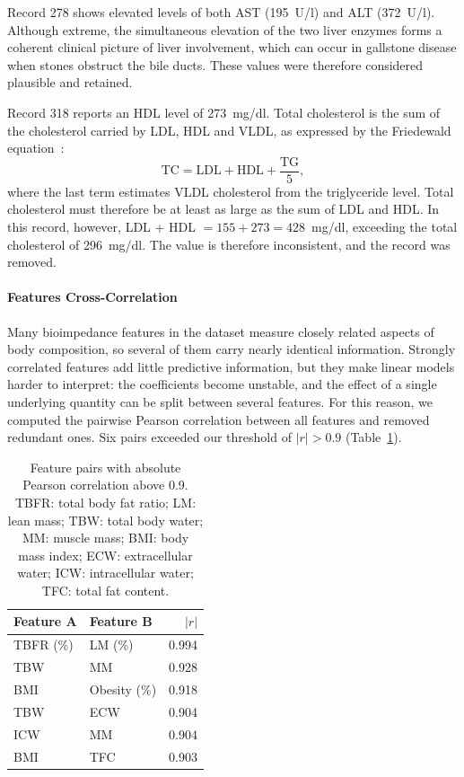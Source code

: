 \documentclass[conference]{IEEEtran}
\begin{document}
Record 278 shows elevated levels of both AST (195~U/l) and ALT (372~U/l).
Although extreme, the simultaneous elevation of the two liver enzymes forms a
coherent clinical picture of liver involvement, which can occur in
gallstone disease when stones obstruct the bile ducts. These values were
therefore considered plausible and retained.

Record 318 reports an HDL level of 273~mg/dl. Total cholesterol is the sum of
the cholesterol carried by LDL, HDL and VLDL, as expressed by the Friedewald
equation~\cite{friedewald1972}:
\begin{equation}
\mathrm{TC} = \mathrm{LDL} + \mathrm{HDL} + \frac{\mathrm{TG}}{5},
\end{equation}
where the last term estimates VLDL cholesterol from the triglyceride level.
Total cholesterol must therefore be at least as large as the sum of LDL and
HDL. In this record, however, LDL + HDL $= 155 + 273 = 428$~mg/dl, exceeding
the total cholesterol of 296~mg/dl. The value is therefore inconsistent, and
the record was removed.

\paragraph{Features Cross-Correlation} 

Many bioimpedance features in the dataset measure closely related aspects of
body composition, so several of them carry nearly identical information.
Strongly correlated features add little predictive information, but they make
linear models harder to interpret: the coefficients become unstable, and the
effect of a single underlying quantity can be split between several features.
For this reason, we computed the pairwise Pearson correlation between all
features and removed redundant ones. Six pairs exceeded our threshold of
$|r| > 0.9$ (Table~\ref{tab:correlations}).

\begin{table}[h]
\centering
\caption{Feature pairs with absolute Pearson correlation above 0.9.
TBFR: total body fat ratio; LM: lean mass; TBW: total body water;
MM: muscle mass; BMI: body mass index; ECW: extracellular water;
ICW: intracellular water; TFC: total fat content.}
\begin{tabular}{llr}
\hline
Feature A & Feature B & $|r|$ \\
\hline
TBFR (\%) & LM (\%)       & 0.994 \\
TBW       & MM            & 0.928 \\
BMI       & Obesity (\%)  & 0.918 \\
TBW       & ECW           & 0.904 \\
ICW       & MM            & 0.904 \\
BMI       & TFC           & 0.903 \\
\hline
\end{tabular}
\label{tab:correlations}
\end{table}
\end{document}
